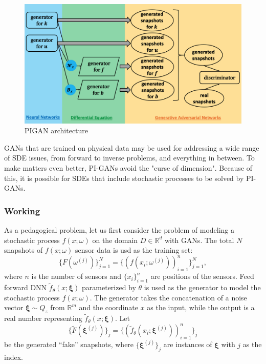 \documentclass[conference,compsoc]{IEEEtran}
\begin{document}
\begin{figure}
    \centering
    \includegraphics[scale=0.25]{figures/PIGAN.png}
    \caption{PIGAN architecture\cite{yang2018physics}}
\end{figure}


GANs that are trained on physical data may be used for addressing a wide range of SDE issues, from forward to inverse problems, and everything in between\cite{yang2018physics}\cite{lou2020physics}. To make matters even better, PI-GANs avoid the "curse of dimension". Because of this, it is possible for SDEs that include stochastic processes to be solved by PI-GANs\cite{yang2018physics}.


\subsubsection{Working}

As a pedagogical problem, let us first consider the problem of modeling a stochastic process $f(x;\omega)$ on the domain $D \in \mathbb{R}^d$ with GANs\cite{yang2018physics}. The total $N$ snapshots of $f(x;\omega)$ sensor data is usd as the training set:
\begin{equation}
    \{F(\omega^{(j)})\}_{j=1}^N = \{(f(x_i;\omega^{(j)}))_{i=1}^{n} \}_{j=1}^N,
\end{equation}
where $n$ is the number of sensors and $\{x_i\}_{i=1}^n$ are positions of the sensors. Feed forward DNN $\tilde{f}_{\theta}(x;\boldsymbol{\xi})$ parameterized by $\theta$ is used as the generator to model the stochastic process $f(x;\omega)$. The generator takes the concatenation of a noise vector $\boldsymbol{\xi} \sim Q_z$ from $\mathbb{R}^{m}$ and the coordinate $x$ as the input, while the output is a real number representing $\tilde{f}_{\theta}(x;\boldsymbol{\xi})$. Let
\begin{equation}
    \{\tilde{F}(\boldsymbol{\xi}^{(j)})\}_{j} = \{(\tilde{f}_{\theta}(x_i;\boldsymbol{\xi}^{(j)}))_{i=1}^{n}\}_{j}
\end{equation}
be the generated ``fake'' snapshots, where $\{\boldsymbol{\xi}^{(j)} \}_{j}$ are instances of $\boldsymbol{\xi}$ with $j$ as the index.
\end{document}
